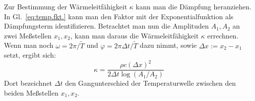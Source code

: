 Zur Bestimmung der Wärmeleitfähigkeit $\kappa$ kann man die Dämpfung
heranziehen. In Gl.~\eqref{eq:temp.fkt.} kann man den Faktor mit der
Exponentialfunktion als Dämpfungsterm identifizieren. Betrachtet man nun
die Amplituden $A_1, A_2$ an zwei Meßstellen $x_1, x_2$, kann man daraus
die Wärmeleitfähigkeit $\kappa$ errechnen. Wenn man noch $\omega =
2\pi/\tilde{T}$ und $\varphi = 2\pi\Delta t/\tilde{T}$ dazu nimmt, sowie
$\Delta x := x_2-x_1$ setzt, ergibt sich:
%
\begin{equation}
  \label{eq:kappa-aus-daempfung}
  \kappa = \frac{\rho c(\Delta x)^2}{2\Delta t\log(A_1/A_2)}
\end{equation}
%
Dort bezeichnet $\Delta t$ den Gangunterschied der Temperaturwelle
zwischen den beiden Meßstellen $x_1, x_2$.

\nocite{v204}
